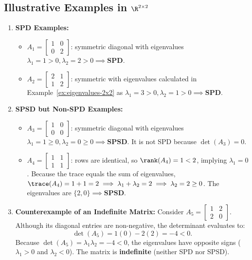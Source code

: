 \subsection{Illustrative Examples in \texorpdfstring{$\R^{2 \times 2}$}{R\textasciicircum(2x2)}}

\begin{example}
\mbox{}\par\nopagebreak
\begin{enumerate}
    \item \textbf{SPD Examples:}
    \begin{itemize}
        \item $A_1 = \begin{bmatrix} 1 & 0 \\ 0 & 2 \end{bmatrix}$: symmetric diagonal with eigenvalues $\lambda_1 = 1 > 0, \lambda_2 = 2 > 0 \implies \mathbf{SPD}$.
        \item $A_2 = \begin{bmatrix} 2 & 1 \\ 1 & 2 \end{bmatrix}$: symmetric with eigenvalues calculated in Example~\ref{ex:eigenvalues-2x2} as $\lambda_1 = 3 > 0, \lambda_2 = 1 > 0 \implies \mathbf{SPD}$.
    \end{itemize}
    \item \textbf{SPSD but Non-SPD Examples:}
    \begin{itemize}
        \item $A_3 = \begin{bmatrix} 1 & 0 \\ 0 & 0 \end{bmatrix}$: symmetric diagonal with eigenvalues $\lambda_1 = 1 \ge 0, \lambda_2 = 0 \ge 0 \implies \mathbf{SPSD}$. It is not SPD because $\det(A_3) = 0$.
        \item $A_4 = \begin{bmatrix} 1 & 1 \\ 1 & 1 \end{bmatrix}$: rows are identical, so $\rank(A_4) = 1 < 2$, implying $\lambda_1 = 0$. Because the trace equals the sum of eigenvalues, $\trace(A_4) = 1 + 1 = 2 \implies \lambda_1 + \lambda_2 = 2 \implies \lambda_2 = 2 \ge 0$. The eigenvalues are $\{2, 0\} \implies \mathbf{SPSD}$.
    \end{itemize}
    \item \textbf{Counterexample of an Indefinite Matrix:}
    Consider $A_5 = \begin{bmatrix} 1 & 2 \\ 2 & 0 \end{bmatrix}$. Although its diagonal entries are non-negative, the determinant evaluates to:
    \begin{equation}
        \det(A_5) = 1(0) - 2(2) = -4 < 0.
    \end{equation}
    Because $\det(A_5) = \lambda_1 \lambda_2 = -4 < 0$, the eigenvalues have opposite signs ($\lambda_1 > 0$ and $\lambda_2 < 0$). The matrix is \textbf{indefinite} (neither SPD nor SPSD).
\end{enumerate}
\end{example}

